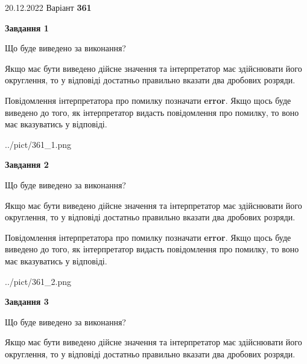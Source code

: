\documentclass[12pt, ukrainian]{article}
\begin{document}
{20.12.2022 Варіант \No \textbf { 361 }\par}
{
\begin {Large}

{\begin {center}\textbf{Завдання 1}\end {center}}\par
Що буде виведено за виконання? \par

Якщо має бути виведено дійсне значення та інтерпретатор має здійснювати його округлення, 
то у відповіді достатньо правильно вказати два дробових розряди.

Повідомлення інтерпретатора про помилку позначати \textbf{error}.
Якщо щось буде виведено до того, як інтерпретатор видасть повідомлення про помилку, 
то воно має вказуватись у відповіді. \par

\begin{center}
	{../pict/361_1.png}
\end{center}
\newpage

{\begin {center}\textbf{Завдання 2}\end {center}}\par
Що буде виведено за виконання? \par

Якщо має бути виведено дійсне значення та інтерпретатор має здійснювати його округлення, 
то у відповіді достатньо правильно вказати два дробових розряди.

Повідомлення інтерпретатора про помилку позначати \textbf{error}.
Якщо щось буде виведено до того, як інтерпретатор видасть повідомлення про помилку, 
то воно має вказуватись у відповіді. \par

\begin{center}
	{../pict/361_2.png}
\end{center}
\newpage

{\begin {center}\textbf{Завдання 3}\end {center}}\par
Що буде виведено за виконання? \par

Якщо має бути виведено дійсне значення та інтерпретатор має здійснювати його округлення, 
то у відповіді достатньо правильно вказати два дробових розряди.


\end{Large}}
\end{document}

